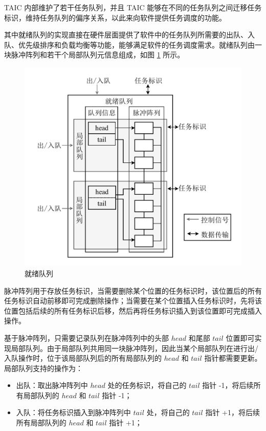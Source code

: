 TAIC 内部维护了若干任务队列，并且 TAIC 能够在不同的任务队列之间迁移任务标识，维持任务队列的偏序关系，以此来向软件提供任务调度的功能。

其中就绪队列的实现直接在硬件层面提供了软件中的任务队列所需要的出队、入队、优先级排序和负载均衡等功能，能够满足软件的任务调度需求。就绪队列由一块脉冲阵列和若干个局部队列元信息组成，如图 \ref{figure:ready_queue} 所示。

\begin{figure}
  \centering
  \includegraphics[width=\textwidth]{figures/pdfs/ready_queue.pdf}
  \caption{就绪队列}
  \label{figure:ready_queue}
\end{figure}

脉冲阵列用于存放任务标识，当需要删除某个位置的任务标识时，该位置后的所有任务标识自动前移即可完成删除操作；当需要在某个位置插入任务标识时，先将该位置包括后续的所有任务标识后移，然后再将任务标识插入到该位置即可完成插入操作。

基于脉冲阵列，只需要记录队列在脉冲阵列中的头部 $head$ 和尾部 $tail$ 位置即可实现局部队列。由于局部队列共用同一块脉冲阵列，因此当某个局部队列在进行出/入队操作时，位于该局部队列后的所有局部队列的 $head$ 和 $tail$ 指针都需要更新。局部队列支持的操作为：

\begin{itemize}
  \item 出队：取出脉冲阵列中 $head$ 处的任务标识，将自己的 $tail$ 指针 -1，将后续所有局部队列的 $head$ 和 $tail$ 指针 -1；
  \item 入队：将任务标识插入到脉冲阵列中 $tail$ 处，将自己的 $tail$ 指针 +1，将后续所有局部队列的 $head$ 和 $tail$ 指针 +1；
\end{itemize}

